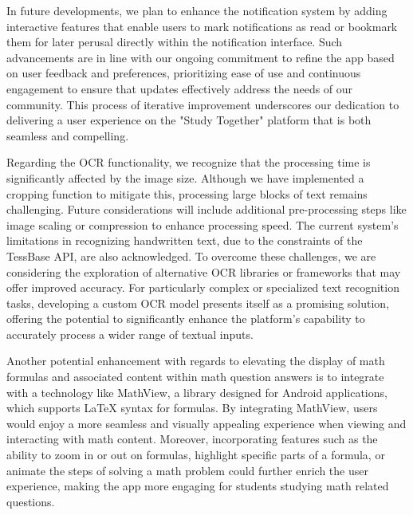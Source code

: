 In future developments, we plan to enhance the notification system by adding interactive features that enable users to mark notifications as read or bookmark them for later perusal directly within the notification interface. Such advancements are in line with our ongoing commitment to refine the app based on user feedback and preferences, prioritizing ease of use and continuous engagement to ensure that updates effectively address the needs of our community. This process of iterative improvement underscores our dedication to delivering a user experience on the "Study Together" platform that is both seamless and compelling.

Regarding the OCR functionality, we recognize that the processing time is significantly affected by the image size. Although we have implemented a cropping function to mitigate this, processing large blocks of text remains challenging. Future considerations will include additional pre-processing steps like image scaling or compression to enhance processing speed. The current system's limitations in recognizing handwritten text, due to the constraints of the TessBase API, are also acknowledged. To overcome these challenges, we are considering the exploration of alternative OCR libraries or frameworks that may offer improved accuracy. For particularly complex or specialized text recognition tasks, developing a custom OCR model presents itself as a promising solution, offering the potential to significantly enhance the platform's capability to accurately process a wider range of textual inputs.

Another potential enhancement with regards to elevating the display of math formulas and associated content within math question answers is to integrate with a technology like MathView, a library designed for Android applications, which supports LaTeX syntax for formulas. By integrating MathView, users would enjoy a more seamless and visually appealing experience when viewing and interacting with math content. Moreover, incorporating features such as the ability to zoom in or out on formulas, highlight specific parts of a formula, or animate the steps of solving a math problem could further enrich the user experience, making the app more engaging for students studying math related questions.


